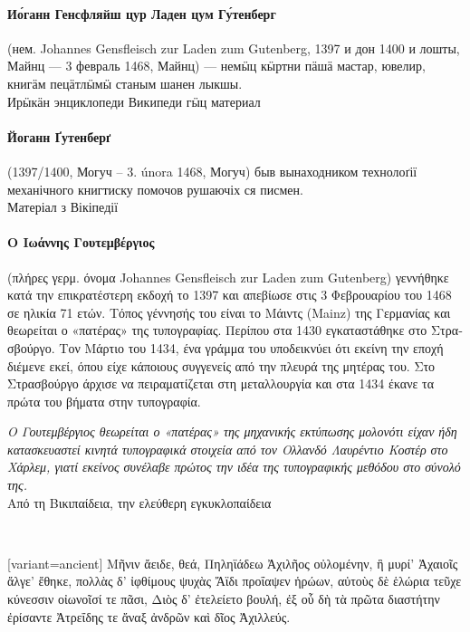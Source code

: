 \documentclass[pagesize,DIV14]{scrartcl}
\begin{document}
\begin{multicols}{2}
\paragraph*{Ио́ганн Генсфляйш цур Ладен цум Гу́тенберг} (нем.
Johannes Gensfleisch zur Laden zum Gutenberg, 1397
и дон 1400 и лошты, Майнц — 3 февраль 1468,
Майнц) — немӹц кӹртни пӓшӓ мастар, ювелир,
книгӓм пецӓтлӹмӹ станым шанен лыкшы.\\
{\scriptsize Ирӹкӓн энциклопеди Википеди гӹц материал}

\paragraph*{Йоганн Ґутенберґ} (1397/1400, Могуч – 3. února
1468, Могуч) быв вынаходником технолоґії
механічного книгтиску помочов рушаючіх ся писмен.\\
{\scriptsize Матеріал з Вікіпедії}

\begin{greek}
\paragraph*{Ο Ιωάννης Γουτεμβέργιος} (πλήρες γερμ. όνομα Johannes Gensfleisch zur Laden zum Gutenberg) γεννήθηκε κατά την επικρατέστερη εκδοχή το 1397 και απεβίωσε στις 3 Φεβρουαρίου του 1468 σε ηλικία 71 ετών. Τόπος γέννησής του είναι το Μάιντς (Mainz) της Γερμανίας και θεωρείται ο «πατέρας» της τυπογραφίας. Περίπου στα 1430 εγκαταστάθηκε στο Στρασβούργο. Τον Μάρτιο του 1434, ένα γράμμα του υποδεικνύει ότι εκείνη την εποχή διέμενε εκεί, όπου είχε κάποιους συγγενείς από την πλευρά της μητέρας του. Στο Στρασβούργο άρχισε να πειραματίζεται στη μεταλλουργία και στα 1434 έκανε τα πρώτα του βήματα στην τυπογραφία.\par
\textit{Ο Γουτεμβέργιος θεωρείται ο «πατέρας» της μηχανικής εκτύπωσης μολονότι είχαν ήδη κατασκευαστεί κινητά τυπογραφικά στοιχεία από τον Ολλανδό Λαυρέντιο Κοστέρ στο Χάρλεμ, γιατί εκείνος συνέλαβε πρώτος την ιδέα της τυπογραφικής μεθόδου στο σύνολό της.}
\\
{\scriptsize Από τη Βικιπαίδεια, την ελεύθερη εγκυκλοπαίδεια}
\end{greek}\\

\begin{greek}[variant=ancient]
    Μῆνιν ἄειδε, θεά, Πηληϊάδεω Ἀχιλῆος
    οὐλομένην, ἣ μυρί' Ἀχαιοῖς ἄλγε' ἔθηκε,
    πολλὰς δ' ἰφθίμους ψυχὰς Ἄϊδι προΐαψεν
    ἡρώων, αὐτοὺς δὲ ἑλώρια τεῦχε κύνεσσιν
    οἰωνοῖσί τε πᾶσι, Διὸς δ' ἐτελείετο βουλή,
    ἐξ οὗ δὴ τὰ πρῶτα διαστήτην ἐρίσαντε
    Ἀτρεΐδης τε ἄναξ ἀνδρῶν καὶ δῖος Ἀχιλλεύς. \par
    

\end{greek}
\end{multicols}
\end{document}
